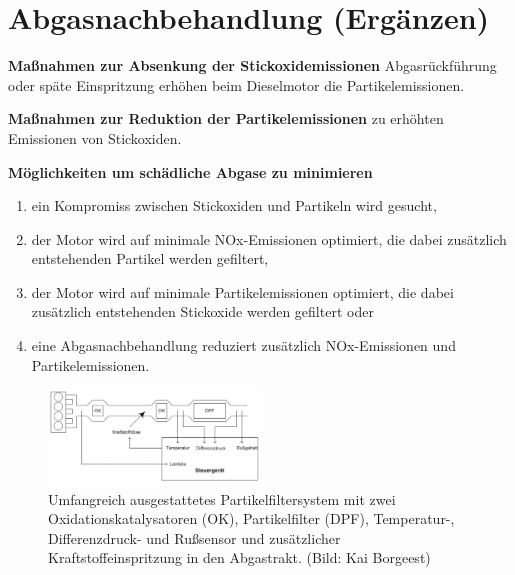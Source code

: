 \newpage

\section{Abgasnachbehandlung
(Ergänzen)}\label{abgasnachbehandlung-ergaenzen}

\textbf{Maßnahmen zur Absenkung der Stickoxidemissionen}
Abgasrückführung oder späte Einspritzung erhöhen beim Dieselmotor die
Partikelemissionen.

\textbf{Maßnahmen zur Reduktion der Partikelemissionen} zu erhöhten
Emissionen von Stickoxiden.

\textbf{Möglichkeiten um schädliche Abgase zu minimieren}

\begin{enumerate}
\item
  ein Kompromiss zwischen Stickoxiden und Partikeln wird gesucht,
\item
  der Motor wird auf minimale NOx-Emissionen optimiert, die dabei
  zusätzlich entstehenden Partikel werden gefiltert,
\item
  der Motor wird auf minimale Partikelemissionen optimiert, die dabei
  zusätzlich entstehenden Stickoxide werden gefiltert oder
\item
  eine Abgasnachbehandlung reduziert zusätzlich NOx-Emissionen und
  Partikelemissionen.
\end{enumerate}

\begin{figure}[!ht]%
\centering
\includegraphics[width=0.5\textwidth]{images/EDC/EDC-13.pdf}
\caption{Umfangreich ausgestattetes Partikelfiltersystem mit zwei
Oxidationskatalysatoren (OK), Partikelfilter (DPF), Temperatur-,
Differenzdruck- und Rußsensor und zusätzlicher Kraftstoffeinspritzung in
den Abgastrakt. (Bild: Kai Borgeest)}
\end{figure}

